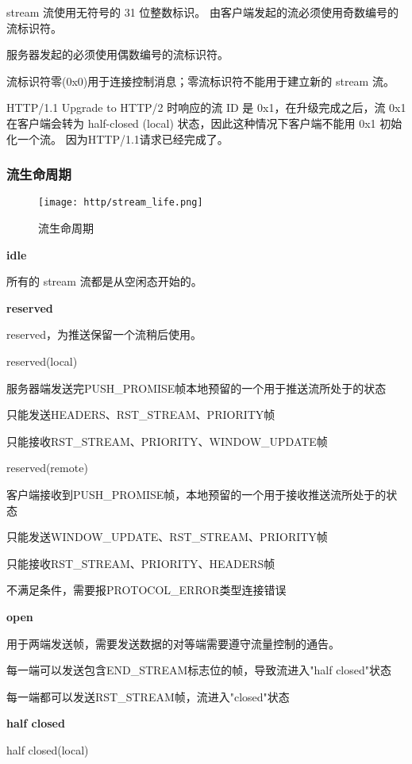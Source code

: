 stream 流使用无符号的 31 位整数标识。
由客户端发起的流必须使用奇数编号的流标识符。

服务器发起的必须使用偶数编号的流标识符。

流标识符零(0x0)用于连接控制消息；零流标识符不能用于建立新的 stream 流。

HTTP/1.1 Upgrade to HTTP/2 时响应的流 ID 是 0x1，在升级完成之后，流 0x1 在客户端会转为 half-closed (local) 状态，因此这种情况下客户端不能用 0x1 初始化一个流。
因为HTTP/1.1请求已经完成了。


\subsubsection{流生命周期}

\begin{figure}[H]
    \centering
    \texttt{[image: http/stream\_life.png]}
    \caption{流生命周期}
\end{figure}


\textbf{idle}

所有的 stream 流都是从空闲态开始的。

\textbf{reserved}

reserved，为推送保留一个流稍后使用。

reserved(local)

\qquad 服务器端发送完PUSH\_PROMISE帧本地预留的一个用于推送流所处于的状态

\qquad 只能发送HEADERS、RST\_STREAM、PRIORITY帧

\qquad 只能接收RST\_STREAM、PRIORITY、WINDOW\_UPDATE帧

reserved(remote)

\qquad 客户端接收到PUSH\_PROMISE帧，本地预留的一个用于接收推送流所处于的状态

\qquad 只能发送WINDOW\_UPDATE、RST\_STREAM、PRIORITY帧

\qquad 只能接收RST\_STREAM、PRIORITY、HEADERS帧

\qquad 不满足条件，需要报PROTOCOL\_ERROR类型连接错误


\textbf{open}

\qquad 用于两端发送帧，需要发送数据的对等端需要遵守流量控制的通告。

\qquad 每一端可以发送包含END\_STREAM标志位的帧，导致流进入"half closed"状态

\qquad 每一端都可以发送RST\_STREAM帧，流进入"closed"状态


 \textbf{half closed}

 half closed(local)

